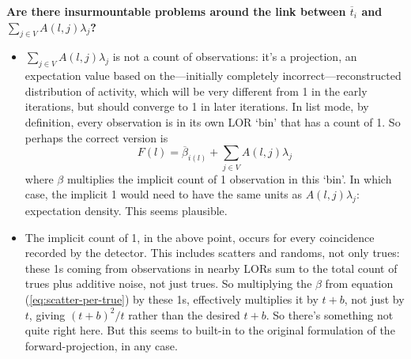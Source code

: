 \documentclass[10pt, a4paper, twocolumn]{article} %
\begin{document}
\textbf{Are there insurmountable problems around the link between
  \(\overline{t}_{i}\) and \(\sum_{j\in V}A(l,j)\lambda_{j}\)?}

\begin{itemize}
  \item \(\sum_{j\in V}A(l,j)\lambda_{j}\) is not a count of observations: it's
        a projection, an expectation value based on the---initially completely
        incorrect---reconstructed distribution of activity, which will be very
        different from 1 in the early iterations, but should converge to 1 in
        later iterations. In list mode, by definition, every observation is in
        its own LOR `bin' that has a count of 1. So perhaps the correct version
        is
        \[ F(l) = \overline{\beta}_{i(l)} + \sum_{j\in V}A(l,j)\lambda_{j}\]
        where \(\beta\) multiplies the implicit count of 1 observation in this
        `bin'. In which case, the implicit 1 would need to have the same units
        as \(A(l,j)\lambda_{j}\): expectation density. This seems plausible.
  \item The implicit count of 1, in the above point, occurs for every
        coincidence recorded by the detector. This includes scatters and
        randoms, not only trues: these 1s coming from observations in nearby
        LORs sum to the total count of trues plus additive noise, not just
        trues. So multiplying the \(\beta\) from equation
        (\ref{eq:scatter-per-true}) by these 1s, effectively multiplies it by
        \(t + b\), not just by \(t\), giving \((t+b)^{2}/t\) rather than the
        desired \(t+b\). So there's something not quite right here. But this
        seems to built-in to the original formulation of the forward-projection,
        in any case.
\end{itemize}



\end{document}
